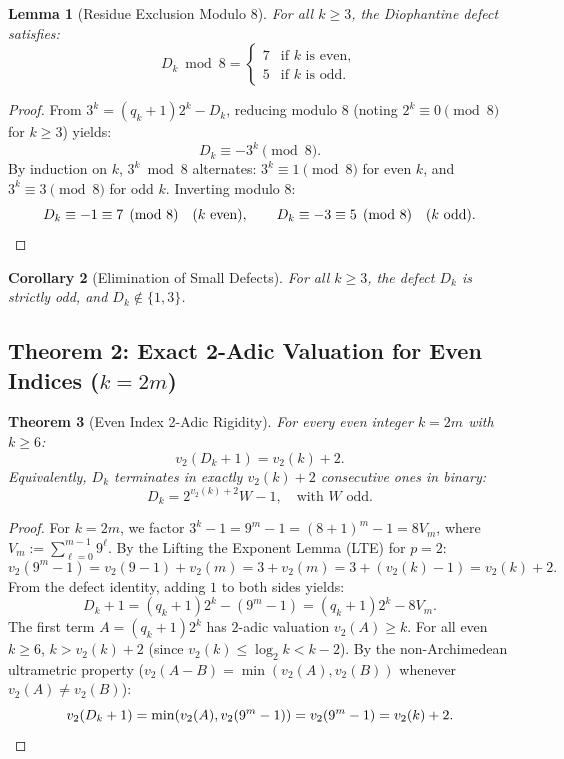 \documentclass[11pt,reqno]{amsart}
\newtheorem{theorem}{Theorem}[section]
\newtheorem{lemma}[theorem]{Lemma}
\newtheorem{corollary}[theorem]{Corollary}
\theoremstyle{definition}
\numberwithin{equation}{section}
\begin{document}
\begin{lemma}[Residue Exclusion Modulo 8]\label{lem:mod8}
For all $k \ge 3$, the Diophantine defect satisfies:
\begin{equation}
D_k \bmod 8 = \begin{cases}
7 & \text{if } k \text{ is even}, \\
5 & \text{if } k \text{ is odd}.
\end{cases}
\end{equation}
\end{lemma}

\begin{proof}
From $3^k = (q_k + 1)2^k - D_k$, reducing modulo $8$ (noting $2^k \equiv 0 \pmod 8$ for $k \ge 3$) yields:
\[
D_k \equiv -3^k \pmod 8.
\]
By induction on $k$, $3^k \bmod 8$ alternates: $3^k \equiv 1 \pmod 8$ for even $k$, and $3^k \equiv 3 \pmod 8$ for odd $k$.
Inverting modulo $8$:
\[
D_k \equiv -1 \equiv 7 \pmod 8 \quad (k \text{ even}), \qquad D_k \equiv -3 \equiv 5 \pmod 8 \quad (k \text{ odd}). \qedhere
\]
\end{proof}

\begin{corollary}[Elimination of Small Defects]\label{cor:small_defects}
For all $k \ge 3$, the defect $D_k$ is strictly odd, and $D_k \notin \{1, 3\}$.
\end{corollary}

\subsection{\texorpdfstring{Theorem 2: Exact 2-Adic Valuation for Even Indices ($k = 2m$)}{Theorem 2: Exact 2-Adic Valuation for Even Indices (k = 2m)}}

\begin{theorem}[Even Index 2-Adic Rigidity]\label{thm:even_lte}
For every even integer $k = 2m$ with $k \ge 6$:
\begin{equation}\label{eq:even_valuation}
v_2(D_k + 1) = v_2(k) + 2.
\end{equation}
Equivalently, $D_k$ terminates in exactly $v_2(k) + 2$ consecutive ones in binary:
\begin{equation}
D_k = 2^{v_2(k)+2} W - 1, \quad \text{with } W \text{ odd}.
\end{equation}
\end{theorem}

\begin{proof}
For $k = 2m$, we factor $3^k - 1 = 9^m - 1 = (8 + 1)^m - 1 = 8 V_m$, where $V_m := \sum_{\ell=0}^{m-1} 9^\ell$.
By the Lifting the Exponent Lemma (LTE) for $p = 2$:
\[
v_2(9^m - 1) = v_2(9 - 1) + v_2(m) = 3 + v_2(m) = 3 + (v_2(k) - 1) = v_2(k) + 2.
\]
From the defect identity, adding $1$ to both sides yields:
\[
D_k + 1 = (q_k + 1)2^k - (9^m - 1) = (q_k + 1)2^k - 8 V_m.
\]
The first term $A = (q_k + 1)2^k$ has $2$-adic valuation $v_2(A) \ge k$.
For all even $k \ge 6$, $k > v_2(k) + 2$ (since $v_2(k) \le \log_2 k < k - 2$).
By the non-Archimedean ultrametric property ($v_2(A - B) = \min(v_2(A), v_2(B))$ whenever $v_2(A) \ne v_2(B)$):
\[
v_2(D_k + 1) = \min(v_2(A), v_2(9^m - 1)) = v_2(9^m - 1) = v_2(k) + 2. \qedhere
\]
\end{proof}
\end{document}
